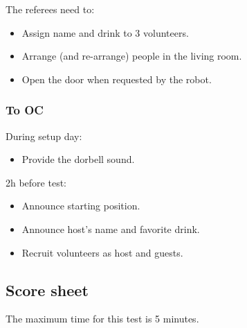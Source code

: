 The referees need to:
\begin{itemize}
	\item Assign name and drink to 3 volunteers.
	\item Arrange (and re-arrange) people in the living room.
	\item Open the door when requested by the robot.
\end{itemize}

\subsubsection*{To OC}

During setup day:
\begin{itemize}
	\item Provide the dorbell sound.
\end{itemize}

2h before test:
\begin{itemize}
	\item Announce starting position.
	\item Announce host's name and favorite drink.
	\item Recruit volunteers as host and guests.
\end{itemize}

\subsection*{Score sheet}
The maximum time for this test is 5 minutes.

\begin{scorelist}[startbutton=false]



	

	

\end{scorelist}
\clearpage
